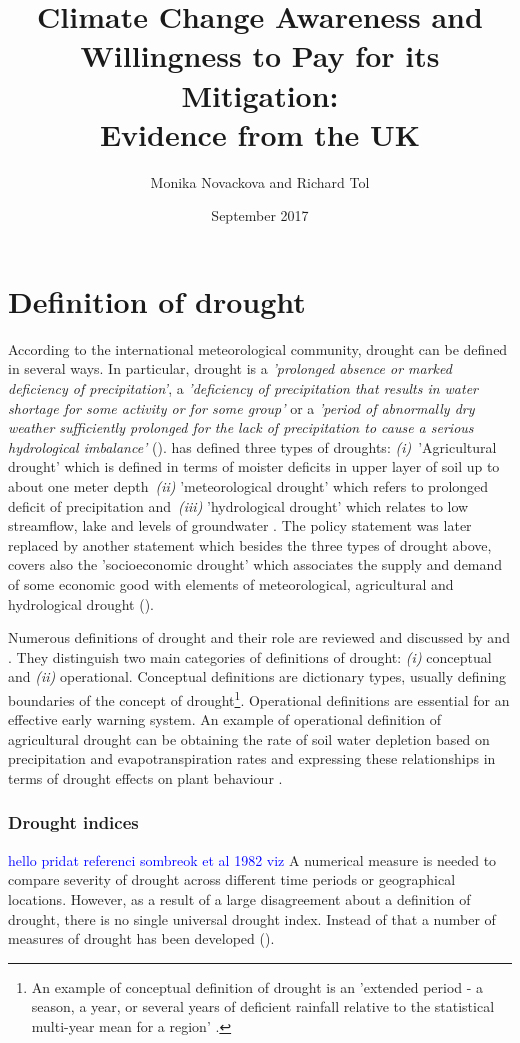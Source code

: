 \documentclass[a4paper,12pt]{article}
\date{\normalsize{September 2017}}
\title{\Large \bf Climate Change Awareness and Willingness to Pay for its Mitigation: \\ Evidence from the UK}
\author{Monika Novackova and Richard Tol}
\affil{\small{Department of Economics, University of Sussex, Falmer, UK}}
\begin{document}
\sloppy
\section*{Definition of drought}
According to the international meteorological community, drought can be defined in several ways. In particular, drought is a \textit{'prolonged absence or marked deficiency of precipitation'}, a \textit{'deficiency of precipitation that results in water shortage for some activity or for some group'} or a \textit{'period of abnormally dry weather sufficiently prolonged for the lack of precipitation to cause a serious hydrological imbalance'} (\citealp{Heim2002, IPCCtrenberth}).
 \cite{AMS1997} has defined three types of droughts: \textit{(i)}~'Agricultural drought' which is defined in terms of moister deficits in upper layer of soil up to about one meter depth~\textit{(ii)} 'meteorological drought' which refers to prolonged deficit of precipitation and~\textit{(iii)} 'hydrological drought' which relates to low streamflow, lake and levels of groundwater . The  \cite{AMS1997} policy statement was later replaced by another statement \citep{AMS2013} which besides the three types of drought above, covers also the 'socioeconomic drought' which associates the supply and demand of some economic good with elements of meteorological, agricultural and hydrological drought (\citealt{Heim2002, IPCCtrenberth}).
 
Numerous definitions of drought and their role are reviewed and discussed by \cite{wilhite1985} and \cite{wilhite2000}. They distinguish two main categories of definitions of drought: \textit{(i)} conceptual and \textit{(ii)} operational. Conceptual definitions are dictionary types, usually defining boundaries of the concept of drought\footnote{An example of conceptual definition of drought is an 'extended period - a season, a year, or several years of deficient rainfall relative to the statistical multi-year mean for a region' \cite{schneider1996}.}. Operational definitions are essential for an effective early warning system. An example of operational definition of agricultural drought can be obtaining the rate of soil water depletion based on precipitation and evapotranspiration rates and expressing these relationships in terms of drought effects on plant behaviour \citep{wilhite2000}.

\subsubsection*{Drought indices}
\textcolor{blue}{hello pridat referenci  sombreok et al 1982 viz \cite{kabubo2007}}
A numerical measure is needed to compare severity of drought across different time periods or geographical locations. However, as a result of a large disagreement about a definition of drought, there is no single universal drought index. Instead of that a number of measures of drought has been developed (\citealp{Heim2002, wilhite1985, wilhite2000}). 
\end{document}

